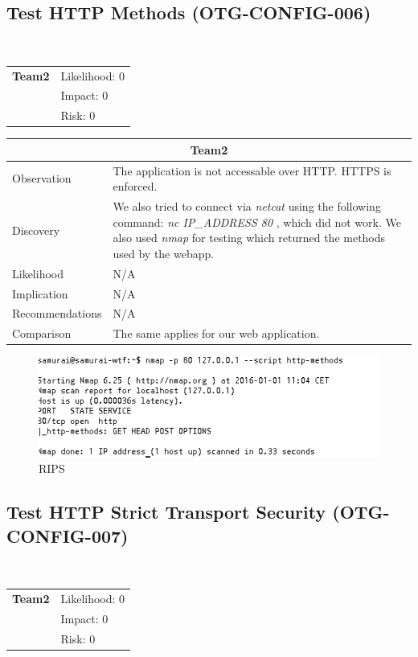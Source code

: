 \documentclass[headsepline,footsepline,footinclude=false,oneside,fontsize=11pt,paper=a4,listof=totoc,bibliography=totoc]{scrbook} %
\begin{document}
\subsection{Test HTTP Methods (OTG-CONFIG-006)}\


\begin{tabular}{cR{12cm}}
	\textbf{Team2} & Likelihood: 0\\& Impact: 0\\& Risk: 0
\end{tabular}

\begin{tabular}{ l|p{11cm}  }
	\hline
	\multicolumn{2}{c}{\textbf{Team2}} \\
	\hline
	Observation   &  The application is not accessable over HTTP. HTTPS is enforced.  \\
	Discovery  &  We also tried to connect via \textit{netcat} using the following command: \textit{{nc IP\_ADDRESS 80}} , which did not work. We also used \textit{nmap} for testing which returned the methods used by the webapp.\\

	Likelihood & N/A \\
	Implication    & N/A \\
	Recommendations & N/A \\
	Comparison &  The same applies for our web application.\\
	\hline
\end{tabular}

\begin{figure}[H]
	\centering
	\includegraphics[width=150mm]{logos/nmap.jpg}
	\caption{RIPS \label{overflow}}
\end{figure} 

\pagebreak
\subsection{Test HTTP Strict Transport Security (OTG-CONFIG-007)}\
\begin{tabular}{cR{12cm}}
	\textbf{Team2} & Likelihood: 0\\& Impact: 0\\& Risk: 0
\end{tabular}
\end{document}
